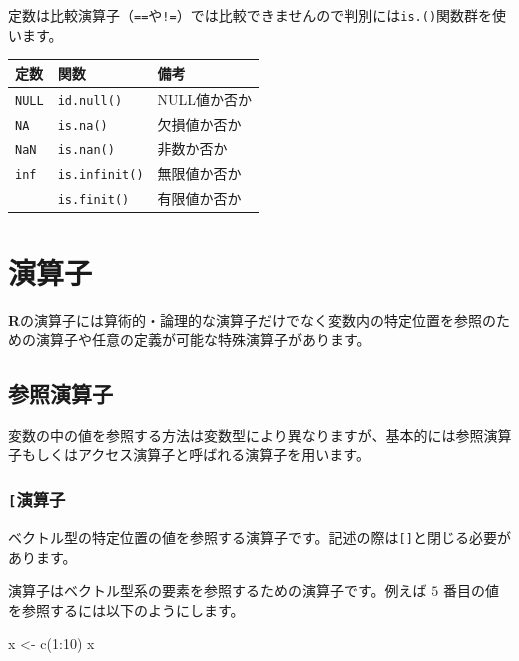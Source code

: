 \documentclass[
  12pt,
]{book}
\newenvironment{Shaded}{\begin{snugshade}}{\end{snugshade}}
\newcommand{\DecValTok}[1]{\textcolor[rgb]{0.00,0.00,0.81}{#1}}
\newcommand{\FunctionTok}[1]{\textcolor[rgb]{0.00,0.00,0.00}{#1}}
\newcommand{\NormalTok}[1]{#1}
\newcommand{\OtherTok}[1]{\textcolor[rgb]{0.56,0.35,0.01}{#1}}
\newcommand{\SpecialCharTok}[1]{\textcolor[rgb]{0.00,0.00,0.00}{#1}}
\begin{document}
定数は比較演算子（\texttt{==}や\texttt{!=}）では比較できませんので判別には\texttt{is.()}関数群を使います。

\begin{longtable}[]{@{}lll@{}}
\toprule
定数 & 関数 & 備考 \\
\midrule
\endhead
\texttt{NULL} & \texttt{id.null()} & NULL値か否か \\
\texttt{NA} & \texttt{is.na()} & 欠損値か否か \\
\texttt{NaN} & \texttt{is.nan()} & 非数か否か \\
\texttt{inf} & \texttt{is.infinit()} & 無限値か否か \\
　 & \texttt{is.finit()} & 有限値か否か \\
\bottomrule
\end{longtable}

\hypertarget{ux6f14ux7b97ux5b50}{%
\section{演算子}\label{ux6f14ux7b97ux5b50}}

\textbf{R}の演算子には算術的・論理的な演算子だけでなく変数内の特定位置を参照のための演算子や任意の定義が可能な特殊演算子があります。

\hypertarget{ux53c2ux7167ux6f14ux7b97ux5b50}{%
\subsection{参照演算子}\label{ux53c2ux7167ux6f14ux7b97ux5b50}}

変数の中の値を参照する方法は変数型により異なりますが、基本的には参照演算子もしくはアクセス演算子と呼ばれる演算子を用います。

\hypertarget{ux6f14ux7b97ux5b50-1}{%
\subsubsection{\texorpdfstring{\texttt{{[}}演算子}{{[}演算子}}\label{ux6f14ux7b97ux5b50-1}}

ベクトル型の特定位置の値を参照する演算子です。記述の際は\texttt{{[}{]}}と閉じる必要があります。

演算子はベクトル型系の要素を参照するための演算子です。例えば \(5\) 番目の値を参照するには以下のようにします。

\begin{Shaded}
\begin{Highlighting}[numbers=left,,]
\NormalTok{x }\OtherTok{\textless{}{-}} \FunctionTok{c}\NormalTok{(}\DecValTok{1}\SpecialCharTok{:}\DecValTok{10}\NormalTok{)}
\NormalTok{x}
\end{Highlighting}
\end{Shaded}
\end{document}
